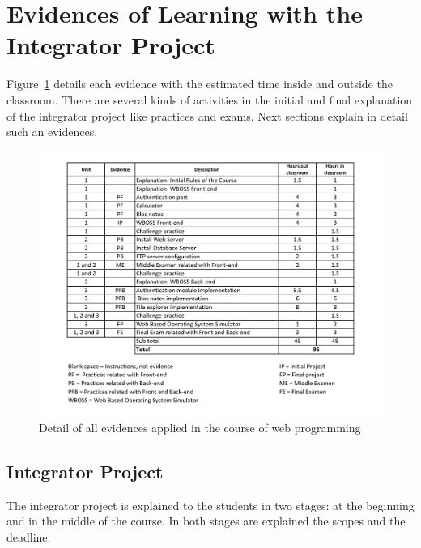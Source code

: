 \section{Evidences of Learning with the Integrator Project}
\label{sec:gralIntegratorProject}
Figure~\ref{fig:evidenceDistribution} details each evidence with the estimated 
time inside and outside the classroom. There are several kinds of activities in the 
initial and final explanation of the integrator project like practices 
and exams. Next sections explain in detail such an evidences.
\begin{figure}[hbt]
  \centering
    \includegraphics[scale=0.5]{images/evidenceDistribution.pdf}
        \caption{Detail of all evidences applied in the course of web programming }
    \label{fig:evidenceDistribution}
\end{figure}

\subsection{Integrator Project}
\label{ssec:integratorProject}
The integrator project is explained to the students in two stages: 
at the beginning and in the middle of the course. 
In both stages are explained the scopes and the deadline.

